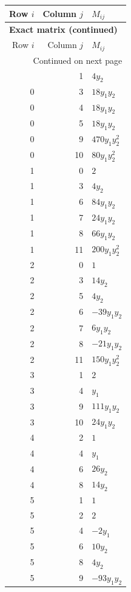 \documentclass[10pt,a4paper]{article}
\begin{document}
{\small\setlength{\tabcolsep}{7pt}\begin{longtable}{rrp{125mm}}
\toprule Row $i$ & Column $j$ & $M_{ij}$\\\midrule\endfirsthead
\multicolumn{3}{l}{\textbf{Exact matrix (continued)}}\\
\toprule Row $i$ & Column $j$ & $M_{ij}$\\\midrule\endhead
\midrule\multicolumn{3}{r}{Continued on next page}\\\endfoot\bottomrule\endlastfoot
0 & 1 & $4 y_{2}$\\
0 & 3 & $18 y_{1} y_{2}$\\
0 & 4 & $18 y_{1} y_{2}$\\
0 & 5 & $18 y_{1} y_{2}$\\
0 & 9 & $470 y_{1} y_{2}^{2}$\\
0 & 10 & $80 y_{1} y_{2}^{2}$\\
1 & 0 & $2$\\
1 & 3 & $4 y_{2}$\\
1 & 6 & $84 y_{1} y_{2}$\\
1 & 7 & $24 y_{1} y_{2}$\\
1 & 8 & $66 y_{1} y_{2}$\\
1 & 11 & $200 y_{1} y_{2}^{2}$\\
2 & 0 & $1$\\
2 & 3 & $14 y_{2}$\\
2 & 5 & $4 y_{2}$\\
2 & 6 & $- 39 y_{1} y_{2}$\\
2 & 7 & $6 y_{1} y_{2}$\\
2 & 8 & $- 21 y_{1} y_{2}$\\
2 & 11 & $150 y_{1} y_{2}^{2}$\\
3 & 1 & $2$\\
3 & 4 & $y_{1}$\\
3 & 9 & $111 y_{1} y_{2}$\\
3 & 10 & $24 y_{1} y_{2}$\\
4 & 2 & $1$\\
4 & 4 & $y_{1}$\\
4 & 6 & $26 y_{2}$\\
4 & 8 & $14 y_{2}$\\
5 & 1 & $1$\\
5 & 2 & $2$\\
5 & 4 & $- 2 y_{1}$\\
5 & 6 & $10 y_{2}$\\
5 & 8 & $4 y_{2}$\\
5 & 9 & $- 93 y_{1} y_{2}$\\

\end{longtable}}
\end{document}
